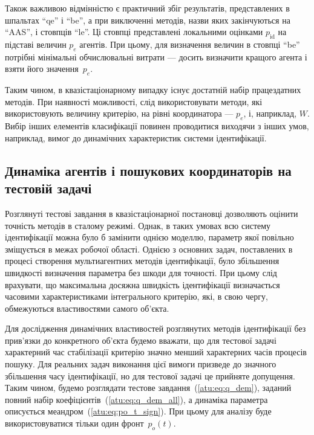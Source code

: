 Також важливою відмінністю є практичний збіг результатів,
представлених в шпальтах ``qe'' і ``be'', а при виключенні методів,
назви яких закінчуються на ``AAS'', і стовпців ``le''. Ці стовпці
представлені локальними оцінками
$p_\mathrm{id}$ на підставі величин
$p_e$ агентів. При цьому, для визначення величин в стовпці ``be''
потрібні мінімальні обчислювальні витрати --- досить визначити
кращого агента і взяти його значення~$p_e$.

Таким чином, в квазістаціонарному випадку існує достатній набір працездатних
методів. При наявності можливості, слід використовувати методи, які
використовують величину критерію, на рівні координатора --- $p_e$, і,
наприклад, $W$. Вибір інших елементів класифікації повинен проводитися
виходячи з інших умов, наприклад, вимог до динамічних характеристик системи
ідентифікації.



\subsection{Динаміка агентів і пошукових координаторів на тестовій задачі}%

Розглянуті тестові завдання в квазістаціонарної постановці
дозволяють оцінити точність методів в сталому режимі. Однак, в
таких умовах всю систему ідентифікації можна було б замінити
однією моделлю, параметр якої повільно зміщується в межах
робочої області. Однією з основних задач, поставлених в
процесі створення мультиагентних методів ідентифікації,
було збільшення швидкості визначення параметра без шкоди
для точності. При цьому слід врахувати, що максимальна
досяжна швидкість ідентифікації визначається часовими
характеристиками інтегрального критерію, які, в свою чергу,
обмежуються властивостями самого об'єкта.

Для дослідження динамічних властивостей розглянутих методів ідентифікації без
прив'язки до конкретного об'єкта будемо вважати, що для тестової задачі
характерний час стабілізації критерію значно менший характерних часів процесів
пошуку.
%
Для реальних задач виконання цієї вимоги призведе до
значного збільшення часу ідентифікації, но для тестової задачі
це прийняте допущення.
%
Таким чином, будемо розглядати тестове завдання~(\ref{atu:eq:q_dem}),
заданий повний набір коефіцієнтів~(\ref{atu:eq:q_dem_all}),
а динаміка параметра описується меандром~(\ref{atu:eq:po_t_sign}).
При цьому для аналізу буде використовуватися тільки один фронт~$p_o(t)$.

